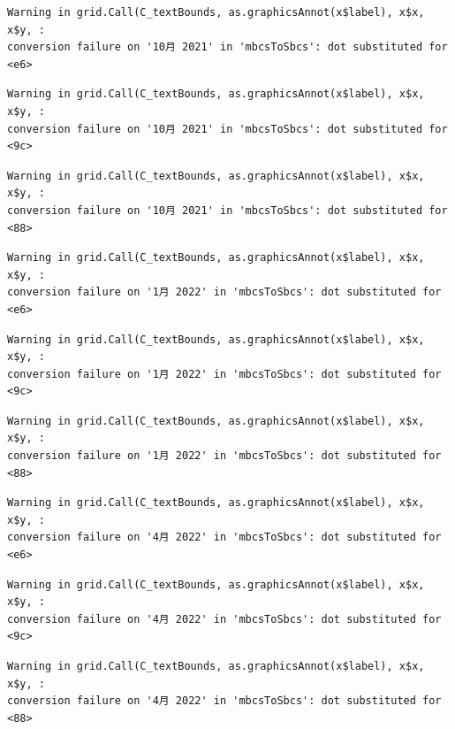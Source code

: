 \documentclass[
  letterpaper,
  DIV=11,
  numbers=noendperiod]{scrartcl}
\begin{document}
\begin{verbatim}
Warning in grid.Call(C_textBounds, as.graphicsAnnot(x$label), x$x, x$y, :
conversion failure on '10月 2021' in 'mbcsToSbcs': dot substituted for <e6>
\end{verbatim}

\begin{verbatim}
Warning in grid.Call(C_textBounds, as.graphicsAnnot(x$label), x$x, x$y, :
conversion failure on '10月 2021' in 'mbcsToSbcs': dot substituted for <9c>
\end{verbatim}

\begin{verbatim}
Warning in grid.Call(C_textBounds, as.graphicsAnnot(x$label), x$x, x$y, :
conversion failure on '10月 2021' in 'mbcsToSbcs': dot substituted for <88>
\end{verbatim}

\begin{verbatim}
Warning in grid.Call(C_textBounds, as.graphicsAnnot(x$label), x$x, x$y, :
conversion failure on '1月 2022' in 'mbcsToSbcs': dot substituted for <e6>
\end{verbatim}

\begin{verbatim}
Warning in grid.Call(C_textBounds, as.graphicsAnnot(x$label), x$x, x$y, :
conversion failure on '1月 2022' in 'mbcsToSbcs': dot substituted for <9c>
\end{verbatim}

\begin{verbatim}
Warning in grid.Call(C_textBounds, as.graphicsAnnot(x$label), x$x, x$y, :
conversion failure on '1月 2022' in 'mbcsToSbcs': dot substituted for <88>
\end{verbatim}

\begin{verbatim}
Warning in grid.Call(C_textBounds, as.graphicsAnnot(x$label), x$x, x$y, :
conversion failure on '4月 2022' in 'mbcsToSbcs': dot substituted for <e6>
\end{verbatim}

\begin{verbatim}
Warning in grid.Call(C_textBounds, as.graphicsAnnot(x$label), x$x, x$y, :
conversion failure on '4月 2022' in 'mbcsToSbcs': dot substituted for <9c>
\end{verbatim}

\begin{verbatim}
Warning in grid.Call(C_textBounds, as.graphicsAnnot(x$label), x$x, x$y, :
conversion failure on '4月 2022' in 'mbcsToSbcs': dot substituted for <88>
\end{verbatim}
\end{document}
